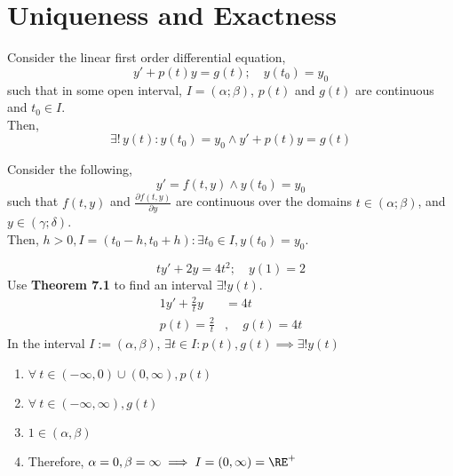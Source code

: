 \documentclass[diffeq.tex]{subfiles}
\begin{document}
    \section{Uniqueness and Exactness}
    \begin{theorem}
        Consider the linear first order differential equation,
        \begin{equation}
            y' + p(t)y = g(t);\quad y(t_{0}) = y_{0}
        \end{equation}
        such that in some open interval, $I = (\alpha; \beta)$, $p(t)$ and $g(t)$ are continuous and $t_{0} \in I$.\\
        Then,
        \begin{equation}
            \exists!\,y(t): y(t_{0}) = y_{0} \wedge y' + p(t)y = g(t)
        \end{equation}
    \end{theorem}
    \begin{theorem}
        Consider the following,
        \begin{equation} 
            y' = f(t, y) \wedge y(t_{0}) = y_{0}
        \end{equation}
        such that $f(t, y)$ and $\frac{\partial f(t, y)}{\partial y}$ are continuous over the domains $t \in (\alpha; \beta)$, and $y \in (\gamma; \delta)$.\\
        Then, $h > 0, I = (t_{0} - h, t_{0} + h): \exists t_{0} \in I, y(t_{0}) = y_{0}$.
    \end{theorem}
    \begin{example}
        \begin{equation}
            ty' + 2y = 4t^{2};\quad y(1) = 2
        \end{equation}
        Use \textbf{Theorem 7.1} to find an interval $\exists!y(t)$.
        \begin{alignat}{1}
            y' + \frac{2}{t}y &= 4t\\
            p(t) = \frac{2}{t}&,\quad g(t) = 4t
        \end{alignat}
        In the interval $I := (\alpha, \beta)$, $\exists t \in I: p(t), g(t) \implies \exists! y(t)$
        \begin{enumerate}
            \item $\forall\ t \in (-\infty, 0)\cup(0,\infty), p(t)$
            \item $\forall\ t \in (-\infty, \infty), g(t)$
            \item $1 \in (\alpha,\beta)$
            \item Therefore, $\alpha = 0, \beta = \infty \implies I = (0, \infty) = \RE^{+}$
        \end{enumerate}
    \end{example}
\end{document}
